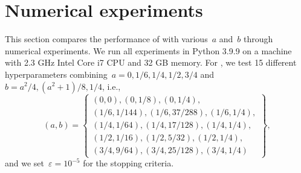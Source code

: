\documentclass[../main]{subfiles}
\begin{document}
\section{Numerical experiments} 
This section compares the performance of  with various~$a$ and~$b$ through numerical experiments.
We run all experiments in Python 3.9.9 on a machine with 2.3 GHz Intel Core i7 CPU and 32 GB memory.
For , we test 15 different hyperparameters combining~$a = 0, 1 / 6, 1 / 4, 1 / 2, 3 / 4$ and~$b = a^2 / 4, (a^2 + 1) / 8, 1 / 4$, i.e.,
\begin{equation}
    (a, b) = \left\{
    \begin{gathered}
        (0, 0), (0, 1 / 8), (0, 1 / 4),\\
        (1 / 6, 1 / 144), (1 / 6, 37 / 288), (1 / 6, 1 / 4),\\
        (1 / 4, 1 / 64), (1 / 4, 17 / 128), (1 / 4, 1 / 4), \\
        (1 / 2, 1 / 16), (1 / 2, 5 / 32), (1 / 2, 1 / 4), \\
        (3 / 4, 9 / 64), (3 / 4, 25 / 128), (3 / 4, 1 / 4)
    \end{gathered}
    \right\},
\end{equation}
and we set~$\varepsilon = 10^{-5}$ for the stopping criteria.
\end{document}
